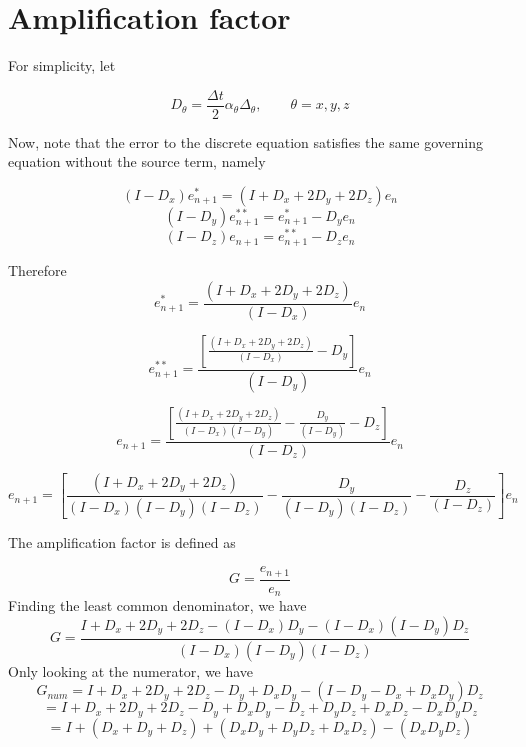 \documentclass[11pt]{article}
\begin{document}
\section{Amplification factor}

For simplicity, let

\begin{equation}
	D_{\theta} = \frac{\Delta t}{2} \alpha_{\theta} \Delta_{\theta}, \qquad \theta = x,y,z
\end{equation}

Now, note that the error to the discrete equation satisfies the same governing equation without the source term, namely

\begin{equation}
	(I-D_x)e_{n+1}^* = (I+D_x+2D_y+2D_z)e_n
\end{equation}
\begin{equation}
	(I-D_y)e_{n+1}^{**} = e_{n+1}^* - D_ye_n
\end{equation}
\begin{equation}
	(I-D_z)e_{n+1} = e_{n+1}^{**} - D_z e_n
\end{equation}

Therefore
\begin{equation}
	e_{n+1}^{*} = 
	\frac{(I+D_x+2D_y+2D_z)}{(I-D_x)}e_n
\end{equation}

\begin{equation}
	e_{n+1}^{**} = 
	\frac{
	\left[
	\frac{(I+D_x+2D_y+2D_z)}{(I-D_x)}-D_y
	\right]
	}{(I-D_y)}e_n
\end{equation}

\begin{equation}
	e_{n+1} = 
	\frac{
	\left[
	\frac{(I+D_x+2D_y+2D_z)}{(I-D_x)(I-D_y)}
	-
	\frac{D_y}{(I-D_y)}
	-
	D_z
	\right]
	}{(I-D_z)}e_n
\end{equation}

\begin{equation}
	e_{n+1} = 
	\left[
	\frac{(I+D_x+2D_y+2D_z)}{(I-D_x)(I-D_y)(I-D_z)}
	-
	\frac{D_y}{(I-D_y)(I-D_z)}
	-
	\frac{D_z}{(I-D_z)}
	\right]
	e_n
\end{equation}

The amplification factor is defined as

\begin{equation}
	G = \frac{e_{n+1}}{e_{n}}
\end{equation}
Finding the least common denominator, we have
\begin{equation}
	G = 
	\frac{I+D_x+2D_y+2D_z - (I-D_x)D_y - (I-D_x)(I-D_y)D_z}{(I-D_x)(I-D_y)(I-D_z)}
\end{equation}
Only looking at the numerator, we have
\begin{equation}
	G_{num} = I+D_x+2D_y+2D_z-D_y+D_x D_y - (I-D_y-D_x+D_xD_y)D_z
\end{equation}
\begin{equation}
	= I+D_x+2D_y+2D_z-D_y+D_x D_y - D_z +D_yD_z +D_xD_z - D_xD_yD_z
\end{equation}
\begin{equation}
	= I+(D_x+D_y+D_z)+(D_xD_y+D_yD_z+D_xD_z)-(D_xD_yD_z)
\end{equation}
\end{document}
